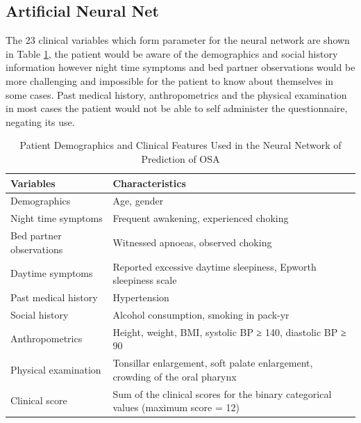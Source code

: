 \subsection{Artificial Neural Net}
The 23 clinical variables which form parameter for the neural network are shown in Table \ref{table:neural}, the patient would be aware of the demographics and social history information however night time symptoms and bed partner observations would be more challenging and impossible for the patient to know about themselves in some cases. Past medical history, anthropometrics and the physical examination in most cases the patient would not be able to self administer the questionnaire, negating its use.
\begin{table}[h]
\centering
\begin{tabular}{l l}
\toprule
Variables&Characteristics\\ \midrule
Demographics&Age, gender\\ 
Night time symptoms&Frequent awakening, experienced choking\\ 
Bed partner observations&Witnessed apnoeas, observed choking\\ 
Daytime symptoms&Reported excessive daytime sleepiness, Epworth sleepiness scale\\ 
Past medical history&Hypertension\\ 
Social history&Alcohol consumption, smoking in pack-yr\\ 
Anthropometrics&Height, weight, BMI, systolic BP ≥ 140, diastolic BP ≥ 90\\ 
Physical examination&Tonsillar enlargement, soft palate enlargement, crowding of the oral pharynx\\ 
Clinical score&Sum of the clinical scores for the binary categorical values (maximum score = 12)\\ \bottomrule
\end{tabular}
\caption{Patient Demographics and Clinical Features Used in the Neural Network of Prediction of OSA}
\label{table:neural}
\end{table} 

